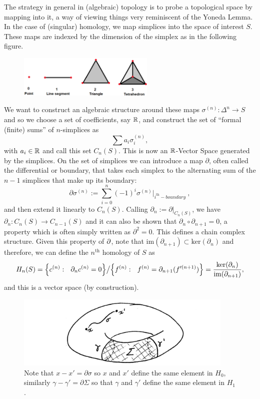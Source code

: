 The strategy in general in (algebraic) topology is to probe a topological space by mapping into it, a way of viewing things very reminiscent of the Yoneda Lemma.
In the case of (singular) homology, we map simplices into the space of interest $S$. These maps are indexed by the dimension of the simplex as in the following figure.
\begin{figure}[!ht]
\centering
\includegraphics[width=6.5cm]{images/Lecture 1/simplex.png}
\end{figure}
We want to construct an algebraic structure around these maps $\sigma^{(n)}:\Delta^n\to S$ and so we  choose a set of coefficients, say $\mathbb{R}$, and construct the set of ``formal (finite) sums''  of $n$-simplices as
$$\sum a_i\sigma^{(n)}_i  ,$$
with $a_i\in\mathbb{R}$ and call this set $C_n(S)$. This is now an $\mathbb{R}$-Vector Space generated by the simplices. On the set of simplices we can introduce a map $\partial$, often called the differential or boundary, that takes each simplex to the alternating sum of the $n-1$ simplices that make up its boundary:
$$\partial\sigma^{(n)}:=\sum_{i=0}^{n}(-1)^i\sigma^{(n)}|_{i^{\text{th}}-boundary} \ ,$$
and then extend it linearly to $C_n(S)$. Calling $\partial_n:=\partial|_{C_n(S)}$, we have $\partial_n:C_n(S)\to C_{n-1}(S)$ and it can also be shown that $\partial_n \circ\partial_{n+1}=0$, a property which is often simply written as $\partial^2=0$. This defines a chain complex structure.
Given this property of $\partial$, note that $\text{im}(\partial_{n+1})\subset \text{ker}(\partial_n)$ and therefore, we can define the $n^{\text{th}}$ homology of $S$ as
\begin{equation*}
    H_n(S)=\Big\{c^{(n)}: \ \ \partial_n c^{(n)}=0\Big\}\big{/}\Big\{f^{(n)}: \ \ f^{(n)}=\partial_{n+1} (f'^{(n+1)})\Big\}=\frac{\text{ker}(\partial_n)}{\text{im}(\partial_{n+1})},
\end{equation*}
and this is a vector space (by construction).
\begin{figure}[!ht]
\centering
\captionsetup{labelformat=empty, format = hang}
\begin{measuredfigure}
\includegraphics[width=10.40cm]{images/Lecture 1/homology.jpeg}
\caption{\small{Note that $x-x'=\partial\sigma$ so $x$ and $x'$ define the same element in $H_0$, similarly $\gamma-\gamma'=\partial\Sigma$ so that $\gamma$ and $\gamma'$ define the same element in $H_1$.}}
\end{measuredfigure}
\end{figure}

